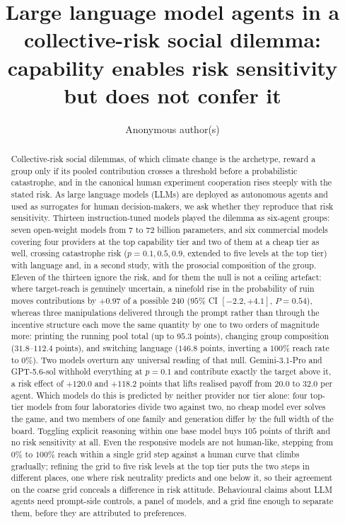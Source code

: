 \documentclass[openacc]{rsproca_new}
\begin{document}
\title{Large language model agents in a collective-risk social dilemma: capability enables risk sensitivity but does not confer it}

\author{Anonymous author(s)}

\address{Anonymous affiliation}

\subject{artificial intelligence, behaviour, evolutionary game theory}


\begin{abstract}
Collective-risk social dilemmas, of which climate change is the archetype, reward a group only if its pooled contribution crosses a threshold before a probabilistic catastrophe, and in the canonical human experiment cooperation rises steeply with the stated risk. As large language models (LLMs) are deployed as autonomous agents and used as surrogates for human decision-makers, we ask whether they reproduce that risk sensitivity. Thirteen instruction-tuned models played the dilemma as six-agent groups: seven open-weight models from 7 to 72 billion parameters, and six commercial models covering four providers at the top capability tier and two of them at a cheap tier as well, crossing catastrophe risk ($p=0.1,0.5,0.9$, extended to five levels at the top tier) with language and, in a second study, with the prosocial composition of the group. Eleven of the thirteen ignore the risk, and for them the null is not a ceiling artefact: where target-reach is genuinely uncertain, a ninefold rise in the probability of ruin moves contributions by $+0.97$ of a possible $240$ ($95\%$ CI $[-2.2,+4.1]$, $P=0.54$), whereas three manipulations delivered through the prompt rather than through the incentive structure each move the same quantity by one to two orders of magnitude more: printing the running pool total (up to $95.3$ points), changing group composition ($31.8$--$112.4$ points), and switching language ($146.8$ points, inverting a $100\%$ reach rate to $0\%$). Two models overturn any universal reading of that null. Gemini-3.1-Pro and GPT-5.6-sol withhold everything at $p=0.1$ and contribute exactly the target above it, a risk effect of $+120.0$ and $+118.2$ points that lifts realised payoff from $20.0$ to $32.0$ per agent. Which models do this is predicted by neither provider nor tier alone: four top-tier models from four laboratories divide two against two, no cheap model ever solves the game, and two members of one family and generation differ by the full width of the board. Toggling explicit reasoning within one base model buys $105$ points of thrift and no risk sensitivity at all. Even the responsive models are not human-like, stepping from $0\%$ to $100\%$ reach within a single grid step against a human curve that climbs gradually; refining the grid to five risk levels at the top tier puts the two steps in different places, one where risk neutrality predicts and one below it, so their agreement on the coarse grid conceals a difference in risk attitude. Behavioural claims about LLM agents need prompt-side controls, a panel of models, and a grid fine enough to separate them, before they are attributed to preferences.

\end{abstract}
\end{document}
